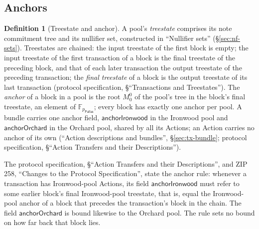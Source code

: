 \documentclass[11pt,a4paper]{article}
\theoremstyle{definition}
\newtheorem{definition}[theorem]{Definition}
\newcommand{\F}{\mathbb{F}}
\newcommand{\Pallas}{\ensuremath{\mathsf{Pallas}}}
\begin{document}
\FloatBarrier
\subsection{Anchors}\label{sec:tree-anchors}

\begin{definition}[Treestate and anchor]
A pool's \emph{treestate} comprises its note commitment tree and its
nullifier set, constructed in ``Nullifier sets'' (\S\ref{sec:nf-sets}).
Treestates are chained: the input treestate of the first block is empty; the
input treestate of the first transaction of a block is the final treestate
of the preceding block, and that of each later transaction the output
treestate of the preceding transaction; the \emph{final treestate} of a
block is the output treestate of its last transaction (protocol
specification, \S``Transactions and Treestates''). The \emph{anchor} of a
block in a pool is the root $M^0_0$ of the pool's tree in the block's final
treestate, an element of $\F_{p_{\Pallas}}$; every block has exactly one
anchor per pool. A bundle carries one anchor field, $\mathsf{anchorIronwood}$
in the Ironwood pool and $\mathsf{anchorOrchard}$ in the Orchard pool,
shared by all its Actions; an Action carries no anchor of its own
(``Action descriptions and bundles'', \S\ref{sec:tx-bundle}; protocol
specification, \S``Action Transfers and their Descriptions'').
\end{definition}

The protocol specification, \S``Action Transfers and their Descriptions'',
and ZIP 258, ``Changes to the Protocol Specification'', state the anchor
rule: whenever a transaction has Ironwood-pool Actions, its field
$\mathsf{anchorIronwood}$ must refer to some earlier block's final
Ironwood-pool treestate, that is, equal the Ironwood-pool anchor of a block
that precedes the transaction's block in the chain. The field
$\mathsf{anchorOrchard}$ is bound likewise to the Orchard pool. The rule sets
no bound on how far back that block lies.
\end{document}
